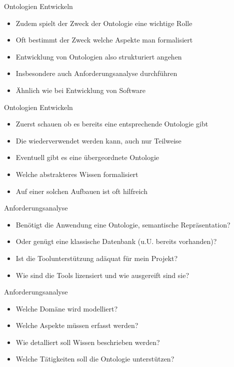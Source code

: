 \documentclass{beamer}
\begin{document}
\begin{frame}{Ontologien Entwickeln}
	
	\begin{itemize}
		\item Zudem spielt der Zweck der Ontologie eine wichtige Rolle
		\item Oft bestimmt der Zweck welche Aspekte man formalisiert
		\item Entwicklung von Ontologien also strukturiert angehen
		\item Insbesondere auch Anforderungsanalyse durchführen
		\item Ähnlich wie bei Entwicklung von Software
	\end{itemize}
	
\end{frame}

\begin{frame}{Ontologien Entwickeln}
	
	\begin{itemize}
		\item Zuerst schauen ob es bereits eine entsprechende \textit{}Ontologie gibt
		\item Die wiederverwendet werden kann, auch nur Teilweise
		\item Eventuell gibt es eine übergeordnete Ontologie
		\item Welche abstrakteres Wissen formalisiert
		\item Auf einer solchen Aufbauen ist oft hilfreich
	\end{itemize}
	
\end{frame}

\begin{frame}{Anforderungsanalyse}
	
	\begin{itemize}
		\item Benötigt die Anwendung eine Ontologie, semantische Repräsentation?
		\item Oder genügt eine klassische Datenbank (u.U. bereits vorhanden)?
		\item Ist die Toolunterstützung adäquat für mein Projekt?
		\item Wie sind die Tools lizensiert und wie ausgereift sind sie?
	\end{itemize}
	
\end{frame}

\begin{frame}{Anforderungsanalyse}
	
	\begin{itemize}
		\item Welche Domäne wird modelliert?
		\item Welche Aspekte müssen erfasst werden?
		\item Wie detalliert soll Wissen beschrieben werden?
		\item Welche Tätigkeiten soll die Ontologie unterstützen?
	\end{itemize}
	
\end{frame}
\end{document}
